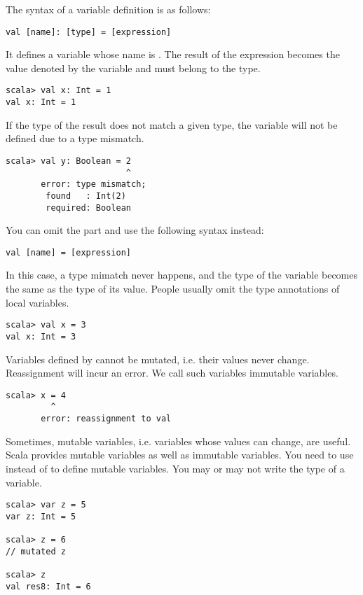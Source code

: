 The syntax of a variable definition is as follows:

\begin{verbatim}
val [name]: [type] = [expression]
\end{verbatim}

It defines a variable whose name is \code{[name]}.
The result of the expression becomes the value denoted by the variable and
must belong to the type.

\begin{verbatim}
scala> val x: Int = 1
val x: Int = 1
\end{verbatim}

If the type of the result does not match a given type, the variable will not be
defined due to a type mismatch.

\begin{verbatim}
scala> val y: Boolean = 2
                        ^
       error: type mismatch;
        found   : Int(2)
        required: Boolean
\end{verbatim}

You can omit the \code{: [type]} part and use the following syntax instead:

\begin{verbatim}
val [name] = [expression]
\end{verbatim}

In this case, a type mimatch never happens, and the
type of the variable becomes the same as the type of its value.
People usually omit the type annotations of local variables.

\begin{verbatim}
scala> val x = 3
val x: Int = 3
\end{verbatim}

Variables defined by  cannot be mutated, i.e. their values never
change. Reassignment will incur an error. We call such variables immutable
variables.

\begin{verbatim}
scala> x = 4
         ^
       error: reassignment to val
\end{verbatim}

Sometimes, mutable variables, i.e. variables whose values can change, are useful.
Scala provides mutable variables as well as immutable variables. You need to use
 instead of  to define mutable variables. You may or may not write
the type of a variable.

\begin{verbatim}
scala> var z = 5
var z: Int = 5

scala> z = 6
// mutated z

scala> z
val res8: Int = 6
\end{verbatim}

